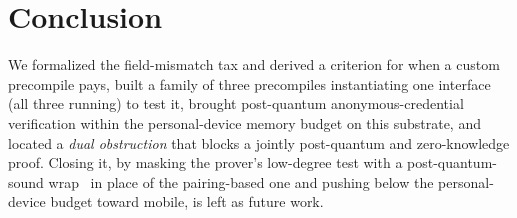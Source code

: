\section{Conclusion}
We formalized the field-mismatch tax and derived a criterion for when a custom precompile pays, built a family of three precompiles instantiating one interface (all three running) to test it, brought post-quantum anonymous-credential verification within the personal-device memory budget on this substrate, and located a \emph{dual obstruction} that blocks a jointly post-quantum and zero-knowledge proof. Closing it, by masking the prover's low-degree test with a post-quantum-sound wrap~\cite{cryptoeprint:2024/1037,cryptoeprint:2026/683} in place of the pairing-based one and pushing below the personal-device budget toward mobile, is left as future work.
